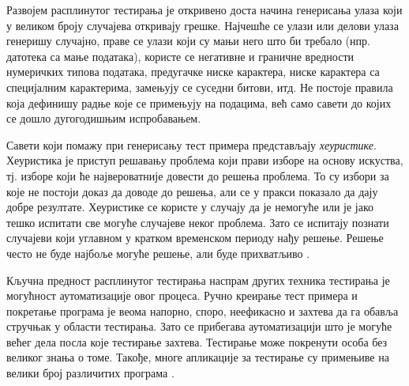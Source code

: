 \documentclass[12pt,oneside]{memoir}
\begin{document}
Развојем расплинутог тестирања је откривено доста начина генерисања улаза који у великом броју случајева откривају грешке. Најчешће се улази или делови улаза генеришу случајно, праве се улази који су мањи него што би требало (нпр. датотека са мање података), користе се негативне и граничне вредности нумеричких типова података, предугачке ниске карактера, ниске карактера са специјалним карактерима, замењују се суседни битови, итд. Не постоје правила која дефинишу радње које се примењују на подацима, већ само савети до којих се дошло дугогодишњим испробавањем.

Савети који помажу при генерисању тест примера представљају \textit{хеуристике}. Хеуристика је приступ решавању проблема који прави изборе на основу искуства, тј. изборе који ће највероватније довести до решења проблема. То су избори за које не постоји доказ да доводе до решења, али се у пракси показало да дају добре резултате. Хеуристике се користе у случају да је немогуће или је јако тешко испитати све могуће случајеве неког проблема. Зато се испитају познати случајеви који углавном у кратком временском периоду нађу решење. Решење често не буде најбоље могуће решење, али буде прихватљиво \cite{heuristics}.

Кључна предност расплинутог тестирања наспрам других техника тестирања је могућност аутоматизације овог процеса. Ручно креирање тест примера и покретање програма је веома напорно, споро, неефикасно и захтева да га обавља стручњак у области тестирања. Зато се прибегава аутоматизацији што је могуће већег дела посла које тестирање захтева. Тестирање може покренути особа без великог знања о томе. Такође, многе апликације за тестирање су примењиве на велики број различитих програма \cite{fuzzingBrute, fuzzing}.
\end{document}
